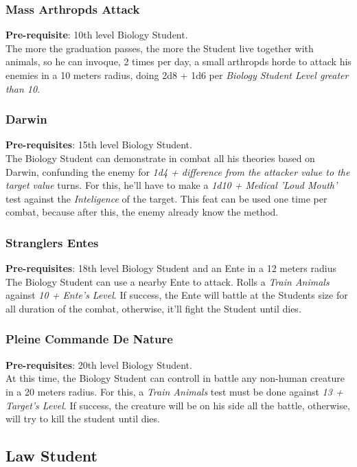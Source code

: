 \documentclass[ letterpaper,12pt]{article}
\begin{document}
\subsubsection{Mass Arthropds Attack}
{\bf Pre-requisite}: 10th level Biology Student.\\
The more the graduation passes, the more the Student live together with animals, so he can invoque, 2 times per day, a small arthropds horde to attack his enemies in a 10 meters radius, doing 2d8 + 1d6 per {\it Biology Student Level greater than 10}.

\subsubsection{Darwin}
{\bf Pre-requisites}: 15th level Biology Student.\\
The Biology Student can demonstrate in combat all his theories based on Darwin, confunding the enemy for {\it 1d4 + difference from the attacker value to the target value} turns. For this, he'll have to make a {\it 1d10 + Medical 'Loud Mouth'} test against the {\it Inteligence} of the target. This feat can be used one time per combat, because after this, the enemy already know the method.

\subsubsection{Stranglers Entes}
{\bf Pre-requisites}: 18th level Biology Student and an Ente in a 12 meters radius\\
The Biology Student can use a nearby Ente to attack. Rolls a {\it Train Animals} against {\it 10 + Ente's Level}. If success, the Ente will battle at the Students size for all duration of the combat, otherwise, it'll fight the Student until dies.

\subsubsection{Pleine Commande De Nature}
{\bf Pre-requisites}: 20th level Biology Student.\\ 
At this time, the Biology Student can controll in battle any non-human creature in a 20 meters radius. For this, a {\it Train Animals} test must be done against {\it 13 + Target's Level}. If success, the creature will be on his side all the battle, otherwise, will try to kill the student until dies.

\subsection{Law Student}
\end{document}
